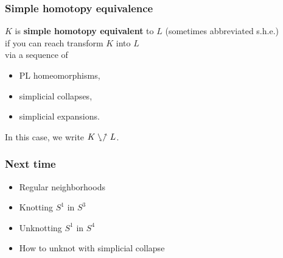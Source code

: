 \documentclass[14pt]{beamer}
\newcommand{\she}{\ssearrow\nnearrow}
\newcommand{\setbackgroundpicture}[1]{%
\usebackgroundtemplate{
\begin{pgfpicture}{0in}{0in}{\paperwidth}{\paperheight}
\pgfputat{\pgfxy(0,0)}{\texttt{[image: \#1]}}
\color{white}
\pgfsetfillopacity{0.8}
\pgfrect[fill]{\pgfxy(0,0)}{\pgfpoint{\paperwidth}{\paperheight}}
\end{pgfpicture}
}
}
\newcommand{\clearbackgroundpicture}{\usebackgroundtemplate{}}
\begin{document}
\begin{frame}
  \frametitle{Simple homotopy equivalence}

  \begin{definition}
    $K$ is \textbf{simple homotopy equivalent} to $L$
    \quad (sometimes abbreviated s.h.e.) \\
    if you can reach transform $K$ into $L$ \\
    via a sequence of
    \begin{itemize}
    \item PL homeomorphisms,
    \item simplicial collapses,
    \item simplicial expansions.
    \end{itemize}
    In this case, we write $K \she L$.
  \end{definition}

\end{frame}



\setbackgroundpicture{zeeman.pdf}
\begin{frame}
  \frametitle{Next time}
  \pause
  \begin{itemize}
    \item Regular neighborhoods \\
    \item Knotting $S^1$ in $S^3$ \\
    \item Unknotting $S^1$ in $S^4$ \\
    \item How to unknot with simplicial collapse
\end{itemize}

\end{frame}
\clearbackgroundpicture
\end{document}
